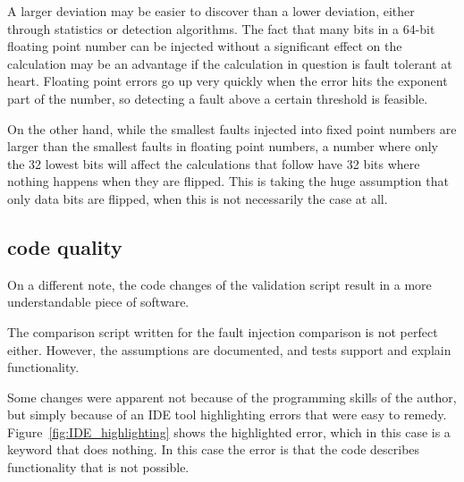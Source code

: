 A larger deviation may be easier to discover than a lower deviation, either through statistics or detection algorithms. The fact that many bits in a 64-bit floating point number can be injected without a significant effect on the calculation may be an advantage if the calculation in question is fault tolerant at heart. Floating point errors go up very quickly when the error hits the exponent part of the number, so detecting a fault above a certain threshold is feasible.

On the other hand, while the smallest faults injected into fixed point numbers are larger than the smallest faults in floating point numbers, a number where only the 32 lowest bits will affect the calculations that follow have 32 bits where nothing happens when they are flipped. This is taking the huge assumption that only data bits are flipped, when this is not necessarily the case at all.




\subsection{code quality}

On a different note, the code changes of the validation script result in a more understandable piece of software.

The comparison script written for the fault injection comparison is not perfect either. However, the assumptions are documented, and tests support and explain functionality. 

Some changes were apparent not because of the programming skills of the author, but simply because of an IDE tool highlighting errors that were easy to remedy. Figure~\ref{fig:IDE_highlighting} shows the highlighted error, which in this case is a keyword that does nothing. In this case the error is that the code describes functionality that is not possible.

